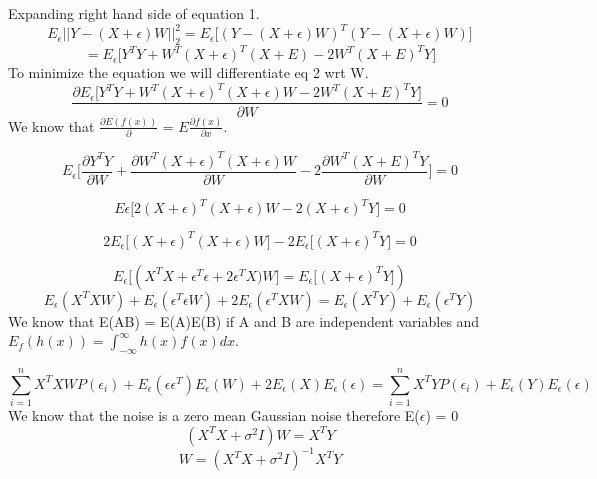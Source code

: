 \documentclass{article}
\begin{document}
Expanding right hand side of equation 1.
\begin{equation*}
 E_\epsilon || Y - (X+\epsilon)W||_2^2  = E_\epsilon \bigg[(Y - (X+\epsilon)W)^T(Y - (X+\epsilon)W)\bigg]
\end{equation*}
\begin{equation*}
= E_\epsilon \bigg[ Y^TY + W^T(X+\epsilon)^T(X+E) - 2W^T(X+E)^TY \bigg] \tag{2}
\end{equation*}
To minimize the equation we will differentiate eq 2 wrt W.
\begin{equation*}
	\frac{\partial E_\epsilon \bigg[ Y^TY + W^T(X+\epsilon)^T(X+\epsilon)W - 2W^T(X+E)^TY \bigg]}{\partial W} = 0
\end{equation*}
We know that $\frac{\partial E(f(x))}{\partial}$  = $E\frac{\partial f(x)}{\partial x}$.

\begin{equation*}
	E_\epsilon \bigg[ \frac{\partial Y^TY}{\partial W } + \frac{\partial W^T(X+\epsilon)^T(X+\epsilon)W}{\partial W} -  2\frac{\partial W^T(X+E)^TY}{\partial W}\bigg] = 0
\end{equation*}

\begin{equation*}
	E\epsilon\big[ 2(X+\epsilon)^T(X+\epsilon)W -2(X+\epsilon)^TY\big] = 0
\end{equation*}

\begin{equation*}
	2E_\epsilon \big[(X+\epsilon)^T(X+\epsilon)W \big] -2 E_\epsilon \big[(X+\epsilon)^TY\big] = 0
\end{equation*}

\begin{equation*}
	E_\epsilon\big[(X^TX+\epsilon^T\epsilon +2\epsilon^TX\big)W] = E_\epsilon\big[(X+\epsilon)^TY\big])
\end{equation*}
\begin{equation*}
	E_\epsilon(X^TXW)+ E_\epsilon(\epsilon^T\epsilon W) + 2E_\epsilon(\epsilon^TX W) = E_\epsilon(X^TY) + E_\epsilon(\epsilon^TY)
\end{equation*}
We know that E(AB) = E(A)E(B) if A and B are independent variables and $E_f(h(x)) = \int_{-\infty}^{\infty}h(x)f(x)dx$.

\begin{equation*}
	\sum_{i=1}^{n}X^TXWP(\epsilon_i) + E_\epsilon(\epsilon\epsilon^T)E_\epsilon(W) +2E_\epsilon(X)E_\epsilon(\epsilon)  = \sum_{i=1}^{n} X^TYP(\epsilon_i) + E_\epsilon(Y)E_\epsilon(\epsilon)
\end{equation*}
We know that the noise is a zero mean Gaussian noise therefore E($\epsilon$) = 0
\begin{equation*}
	(X^TX + \sigma^2I)W = X^TY
\end{equation*}
\begin{equation*}
	W = (X^TX + \sigma^2I)^{-1}X^TY
\end{equation*}
\end{document}
